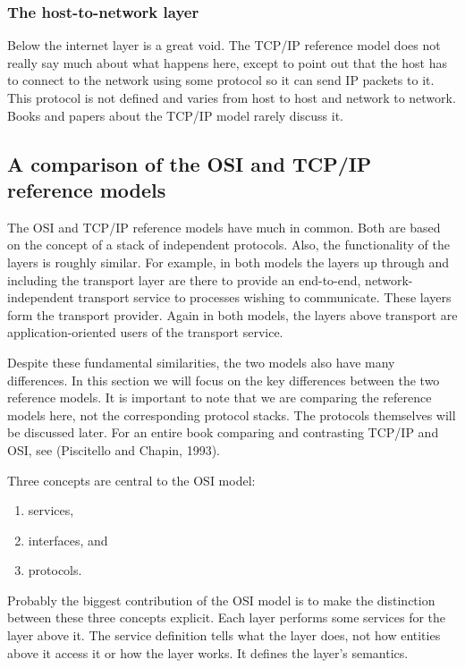 \documentclass[b5paper,11pt]{memoir}
\begin{document}
\subsubsection{The host-to-network layer}

Below the internet layer is a great void. The TCP/IP reference model
does not really say much about what happens here, except to point out
that the host has to connect to the network using some protocol so it
can send IP packets to it. This protocol is not defined and varies from
host to host and network to network. Books and papers about the TCP/IP
model rarely discuss it.



\subsection{A comparison of the OSI and TCP/IP reference models}

The OSI and TCP/IP reference models have much in common. Both are based
on the concept of a stack of independent protocols. Also, the
functionality of the layers is roughly similar. For example, in both
models the layers up through and including the transport layer are there
to provide an end-to-end, network-independent transport service to
processes wishing to communicate. These layers form the transport
provider. Again in both models, the layers above transport are
application-oriented users of the transport service.

Despite these fundamental similarities, the two models also have many
differences. In this section we will focus on the key differences
between the two reference models. It is important to note that we are
comparing the {reference models} here, not the corresponding {protocol
stacks}. The protocols themselves will be discussed later. For an entire
book comparing and contrasting TCP/IP and OSI, see (Piscitello and
Chapin, 1993).

Three concepts are central to the OSI model:
\begin{enumerate}
\item services,
\item interfaces, and
\item protocols.
\end{enumerate}

Probably the biggest contribution of the OSI model is to make the distinction between these three concepts explicit.
Each layer performs some services for the layer above it. The {service} definition tells what the layer does, not how entities above it access it or how the
layer works. It defines the layer's semantics.
\end{document}
